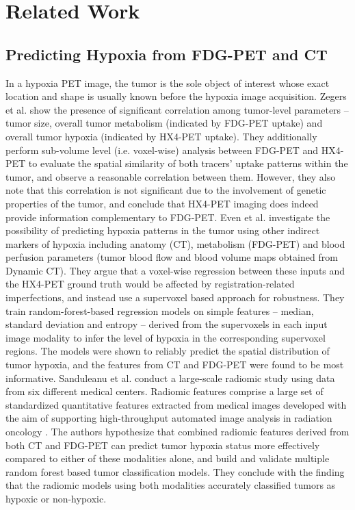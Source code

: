 \chapter{Related Work}
\label{Related_Work}



\section{Predicting Hypoxia from FDG-PET and CT}
\label{Related_Work-hypoxia_prediction}
In a hypoxia PET image, the tumor is the sole object of interest whose exact location and shape is usually known before the hypoxia image acquisition. Zegers et al. \cite{zegers2014vivo} show the presence of significant correlation among tumor-level parameters -- tumor size, overall tumor metabolism (indicated by FDG-PET uptake) and overall tumor hypoxia (indicated by HX4-PET uptake). They additionally perform sub-volume level (i.e. voxel-wise) analysis between FDG-PET and HX4-PET to evaluate the spatial similarity of both tracers' uptake patterns within the tumor, and observe a reasonable correlation between them. However, they also note that this correlation is not significant due to the involvement of genetic properties of the tumor, and conclude that HX4-PET imaging does indeed provide information complementary to FDG-PET. Even et al. \cite{even2017predicting} investigate the possibility of predicting hypoxia patterns in the tumor using other indirect markers of hypoxia including anatomy (CT), metabolism (FDG-PET) and blood perfusion parameters (tumor blood flow and blood volume maps obtained from Dynamic CT). They argue that a voxel-wise regression between these inputs and the HX4-PET ground truth would be affected by registration-related imperfections, and instead use a supervoxel based approach for robustness. They train random-forest-based regression models on simple features -- median, standard deviation and entropy -- derived from the supervoxels in each input image modality to infer the level of hypoxia in the corresponding supervoxel regions. The models were shown to reliably predict the spatial distribution of tumor hypoxia, and the features from CT and FDG-PET were found to be most informative. Sanduleanu et al. \cite{sanduleanu2020non} conduct a large-scale radiomic study using data from six different medical centers. Radiomic features comprise a large set of standardized quantitative features extracted from medical images developed with the aim of supporting high-throughput automated image analysis in radiation oncology \cite{aerts2014decoding}. The authors hypothesize that combined radiomic features derived from both CT and FDG-PET can predict tumor hypoxia status more effectively compared to either of these modalities alone, and build and validate multiple random forest based tumor classification models. They conclude with the finding that the radiomic models using both modalities accurately classified tumors as hypoxic or non-hypoxic.

